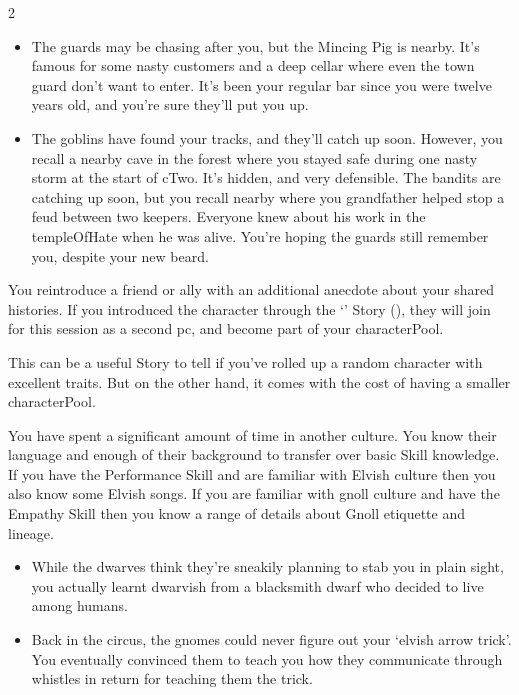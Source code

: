 \begin{multicols}{2}
\begin{exampletext}
  \begin{itemize}
    \item
    The guards may be chasing after you, but the Mincing Pig is nearby.  It's famous for some nasty customers and a deep cellar where even the town guard don't want to enter.
    It's been your regular bar since you were twelve years old, and you're sure they'll put you up.
    \item\ifodd\thecycle%
      The goblins have found your tracks, and they'll catch up soon.
      However, you recall a nearby cave in the forest where you stayed safe during one nasty \gls{storm} at the start of \gls{cTwo}.
      It's hidden, and very defensible.
    \else%
      The bandits are catching up soon, but you recall  nearby where you grandfather helped stop a feud between two \glspl{keeper}.
      Everyone knew about his work in the \gls{templeOfHate} when he was alive.
      You're hoping the guards still remember you, despite your new beard.
    \fi
  \end{itemize}
\end{exampletext}

\label{returnFriend}

You reintroduce a friend or ally with an additional anecdote about your shared histories.
If you introduced the character through the `' Story (), they will join for this session as a second \gls{pc}, and become part of your \gls{characterPool}.

This can be a useful Story to tell if you've rolled up a random character with excellent \glspl{trait}.
But on the other hand, it comes with the cost of having a smaller \gls{characterPool}.

\label{secondLanguage}
You have spent a significant amount of time in another culture.
You know their language and enough of their background to transfer over basic Skill knowledge.
If you have the Performance Skill and are familiar with Elvish culture then you also know some Elvish songs.
If you are familiar with gnoll culture and have the Empathy Skill then you know a range of details about Gnoll etiquette and lineage.

\begin{exampletext}
  \begin{itemize}
    \item
    While the dwarves think they're sneakily planning to stab you in plain sight, you actually learnt dwarvish from a blacksmith dwarf who decided to live among humans.
    \item
    Back in the circus, the gnomes could never figure out your `elvish arrow trick'.
    You eventually convinced them to teach you how they communicate through whistles in return for teaching them the trick.
  \end{itemize}
\end{exampletext}


\end{multicols}
